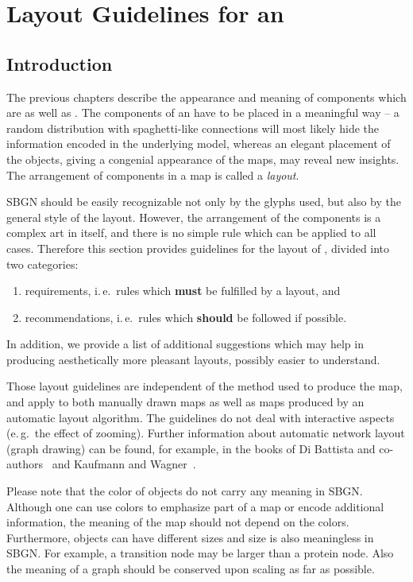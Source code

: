 \chapter{Layout Guidelines for an \ERm}
\label{chp:layout}

\section{Introduction}

The previous chapters describe the appearance and meaning of \SBGNERLone components which are  as well as . The components of an \ERm have to be placed in a meaningful way -- a random distribution with spaghetti-like connections will most likely hide the information encoded in the underlying model, whereas an elegant placement of the objects, giving a congenial appearance of the maps, may reveal new insights. The arrangement of components in a map is called a \emph{layout}.

SBGN \ERms should be easily recognizable not only by the glyphs used, but also by the general style of the layout. However, the arrangement of the components is a complex art in itself, and there is no simple rule which can be applied to all cases. Therefore this section provides guidelines for the layout of \ERs, divided into two categories:
\begin{enumerate}
  \item requirements, i.\,e.~rules which \textbf{must} be fulfilled by a layout, and
  \item recommendations, i.\,e.~rules which \textbf{should} be followed if possible.
\end{enumerate}
In addition, we provide a list of additional suggestions which may help in producing aesthetically more pleasant layouts, possibly easier to understand.

Those layout guidelines are independent of the method used to produce the map, and apply to both manually drawn maps as well as maps produced by an automatic layout algorithm. The guidelines do not deal with interactive aspects (e.\,g.~the effect of zooming). Further information about automatic network layout (graph drawing) can be found, for example, in the books of Di Battista and co-authors~\cite{DiBattista:1998} and Kaufmann and Wagner~\cite{Kaufmann:2001}.

Please note that the color of objects do not carry any meaning in SBGN. Although one can use colors to emphasize part of a map or encode additional information, the meaning of the map should not depend on the colors. Furthermore, objects can have different sizes and size is also meaningless in SBGN. For example, a transition node may be larger than a protein node. Also the meaning of a graph should be conserved upon scaling as far as possible.

